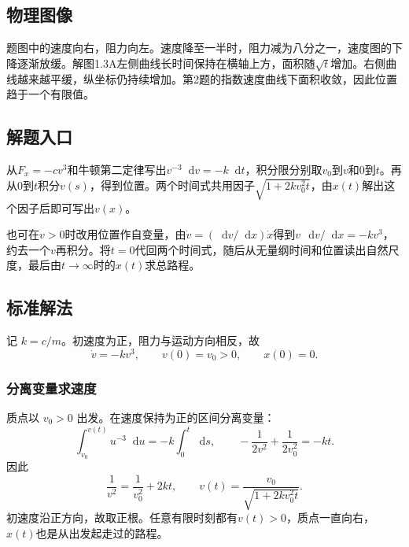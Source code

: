 \documentclass[UTF8,fontset=fandol,a4paper,11pt]{ctexart}
\newcommand{\dd}{\mathop{}\!\mathrm{d}}
\begin{document}


\subsection*{物理图像}

题图中的速度向右，阻力向左。速度降至一半时，阻力减为八分之一，速度图的下降逐渐放缓。解图1.3A左侧曲线长时间保持在横轴上方，面积随$\sqrt t$增加。右侧曲线越来越平缓，纵坐标仍持续增加。第2题的指数速度曲线下面积收敛，因此位置趋于一个有限值。



\subsection*{解题入口}

从$F_x=-cv^3$和牛顿第二定律写出$v^{-3}\dd v=-k\dd t$，积分限分别取$v_0$到$v$和0到$t$。再从0到$t$积分$v(s)$，得到位置。两个时间式共用因子$\sqrt{1+2kv_0^2t}$，由$x(t)$解出这个因子后即可写出$v(x)$。

也可在$v>0$时改用位置作自变量，由$\dot v=(\dd v/\dd x)\dot x$得到$v\,\dd v/\dd x=-kv^3$，约去一个$v$再积分。将$t=0$代回两个时间式，随后从无量纲时间和位置读出自然尺度，最后由$t\to\infty$时的$x(t)$求总路程。



\subsection*{标准解法}

记 $k=c/m$。初速度为正，阻力与运动方向相反，故
\[
\dot v=-kv^3,\qquad v(0)=v_0>0,\qquad x(0)=0.
\]
\subsubsection*{分离变量求速度}
质点以 $v_0>0$ 出发。在速度保持为正的区间分离变量：
\[
\int_{v_0}^{v(t)}u^{-3}\dd u=-k\int_0^t\dd s,
\qquad -\frac1{2v^2}+\frac1{2v_0^2}=-kt.
\]
因此
\[
\frac1{v^2}=\frac1{v_0^2}+2kt,
\qquad\boxed{v(t)=\frac{v_0}{\sqrt{1+2kv_0^2t}}}.
\]
初速度沿正方向，故取正根。任意有限时刻都有$v(t)>0$，质点一直向右，$x(t)$也是从出发起走过的路程。
\end{document}
